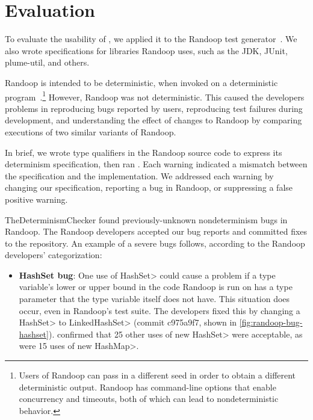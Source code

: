 \section{Evaluation\label{sec:results}}
To evaluate the usability of \theDeterminismChecker,
we applied it to the Randoop test
generator~\cite{PachecoLEB2007}.
We also wrote specifications for libraries Randoop uses, such as the JDK,
JUnit, plume-util, and others.

Randoop is intended to be deterministic, when invoked on a deterministic
program~\cite{randoop-manual}.\footnote{Users of Randoop can pass in a different seed in order to
    obtain a different deterministic output.  Randoop has command-line
    options that enable concurrency and timeouts, both of which can lead to
    nondeterministic behavior.}
However, Randoop was not deterministic.  This caused the developers
problems in 
reproducing bugs reported by users, 
reproducing test failures during development, and
understanding the effect of changes to Randoop by comparing executions of two
similar variants of Randoop.

In brief, we wrote type qualifiers in the Randoop source code to express its
determinism specification,
then ran
\theDeterminismChecker.  Each warning indicated a mismatch between the
specification and the implementation.  We addressed each warning by changing our
specification, reporting a bug in Randoop, or suppressing a false positive warning.

TheDeterminismChecker found \numRandoopBugs previously-unknown nondeterminism bugs in Randoop.
The Randoop developers accepted our bug reports and committed fixes to the repository. An example
of a severe bugs follows, according to the Randoop developers' categorization:

\begin{itemize}
    \item
    \textbf{HashSet bug}: One use of \<HashSet> could cause a problem if a type variable's lower or upper
    bound in the code Randoop is run on has a type parameter that the type variable itself does not have.
    This situation does occur, even in Randoop's test suite.
    The developers fixed this by changing a \<HashSet> to \<LinkedHashSet>
    (commit c975a9f7, shown in \cref{fig:randoop-bug-hashset}).
    \TheDeterminismChecker confirmed that 
    25 other uses of \<new HashSet> were acceptable, as were 15 uses of \<new HashMap>.
\end{itemize}

